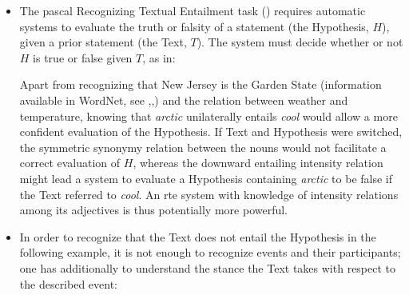 \documentclass[10pt]{article}
\begin{document}
\begin{itemize}
 \item The {\sc pascal} Recognizing Textual Entailment task (\cite{dagan+glickman+magnini:2005,rte}) requires automatic systems to evaluate the truth or falsity of a 
statement (the Hypothesis, $H$), given a prior statement (the Text, $T$). The system must decide whether or not $H$ is true or false given $T$, as in:


\noindent
Apart from recognizing that New Jersey is the Garden State (information available in WordNet, see \cite{clark2007role},\cite{clark2008augmenting},\cite{clark2008using}) and the relation between weather and temperature, 
knowing that \emph{arctic} unilaterally entails \emph{cool} would allow a more confident evaluation of the Hypothesis. 
If Text and Hypothesis were switched, the symmetric synonymy relation between the nouns would not facilitate a correct 
evaluation of $H$, whereas the downward entailing intensity relation might lead a system to evaluate a Hypothesis containing \emph{arctic} to be false if the Text referred to \emph{cool}. An {\sc rte} system with knowledge of intensity relations among 
its adjectives is thus potentially more powerful. 

\item In order to recognize that the Text does not entail the Hypothesis in the following example, it is not enough to recognize events and their participants;  one has additionally to understand the stance the Text takes with respect to the described event:



\end{itemize}
\end{document}
